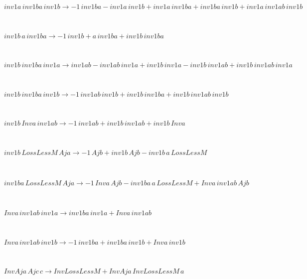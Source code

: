 \documentclass[rep10,leqno]{report}
\begin{document}
\begin{minipage}{6in}
$
inv1a\,
 inv1ba\,
 inv1b\rightarrow -1\,
 inv1ba - inv1a\,
 inv1b + inv1a\,
 inv1ba + inv1ba\,
 inv1b + inv1a\,
 inv1ab\,
 inv1b
$
\end{minipage}\medskip \\
\begin{minipage}{6in}
$
inv1b\,
 a\,
 inv1ba\rightarrow -1\,
 inv1b + a\,
 inv1ba + inv1b\,
 inv1ba
$
\end{minipage}\medskip \\
\begin{minipage}{6in}
$
inv1b\,
 inv1ba\,
 inv1a\rightarrow inv1ab - inv1ab\,
 inv1a + inv1b\,
 inv1a - inv1b\,
 inv1ab + inv1b\,
 inv1ab\,
 inv1a
$
\end{minipage}\medskip \\
\begin{minipage}{6in}
$
inv1b\,
 inv1ba\,
 inv1b\rightarrow -1\,
 inv1ab\,
 inv1b + inv1b\,
 inv1ba + inv1b\,
 inv1ab\,
 inv1b
$
\end{minipage}\medskip \\
\begin{minipage}{6in}
$
inv1b\,
 Inva\,
 inv1ab\rightarrow -1\,
 inv1ab + inv1b\,
 inv1ab + inv1b\,
 Inva
$
\end{minipage}\medskip \\
\begin{minipage}{6in}
$
inv1b\,
 LossLessM\,
 Aja\rightarrow -1\,
 Ajb + inv1b\,
 Ajb - inv1b\,
 a\,
 LossLessM
$
\end{minipage}\medskip \\
\begin{minipage}{6in}
$
inv1ba\,
 LossLessM\,
 Aja\rightarrow -1\,
 Inva\,
 Ajb - inv1ba\,
 a\,
 LossLessM + Inva\,
 inv1ab\,
 Ajb
$
\end{minipage}\medskip \\
\begin{minipage}{6in}
$
Inva\,
 inv1ab\,
 inv1a\rightarrow inv1ba\,
 inv1a + Inva\,
 inv1ab
$
\end{minipage}\medskip \\
\begin{minipage}{6in}
$
Inva\,
 inv1ab\,
 inv1b\rightarrow -1\,
 inv1ba + inv1ba\,
 inv1b + Inva\,
 inv1b
$
\end{minipage}\medskip \\
\begin{minipage}{6in}
$
InvAja\,
 Ajc\,
 c\rightarrow InvLossLessM + InvAja\,
 InvLossLessM\,
 a
$
\end{minipage}\medskip \\
\end{document}
